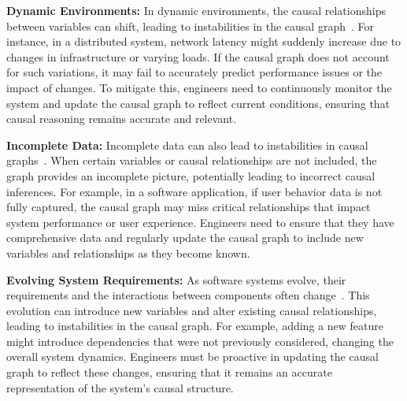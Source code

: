 \documentclass[]{svjour3}
\begin{document}
   \textbf{Dynamic Environments:} In dynamic environments, the causal relationships between variables can shift, leading to instabilities in the causal graph~\cite{dong2014modeling}. For instance, in a distributed system, network latency might suddenly increase due to changes in infrastructure or varying loads. If the causal graph does not account for such variations, it may fail to accurately predict performance issues or the impact of changes. To mitigate this, engineers need to continuously monitor the system and update the causal graph to reflect current conditions, ensuring that causal reasoning remains accurate and relevant.

 \textbf{Incomplete Data:} Incomplete data can also lead to instabilities in causal graphs~\cite{rohrer2018thinking, 10.5555/2073796.2073813}. When certain variables or causal relationships are not included, the graph provides an incomplete picture, potentially leading to incorrect causal inferences. For example, in a software application, if user behavior data is not fully captured, the causal graph may miss critical relationships that impact system performance or user experience. Engineers need to ensure that they have comprehensive data and regularly update the causal graph to include new variables and relationships as they become known.

  \textbf{Evolving System Requirements:} As software systems evolve, their requirements and the interactions between components often change~\cite{9218193}. This evolution can introduce new variables and alter existing causal relationships, leading to instabilities in the causal graph. For example, adding a new feature might introduce dependencies that were not previously considered, changing the overall system dynamics. Engineers must be proactive in updating the causal graph to reflect these changes, ensuring that it remains an accurate representation of the system's causal structure.

\end{document}
